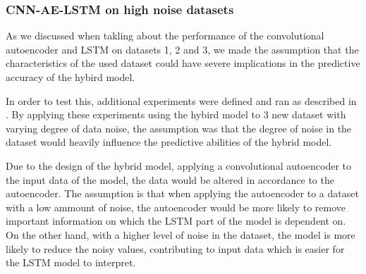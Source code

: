 \subsubsection{CNN-AE-LSTM on high noise datasets}

As we discussed when takling about the performance of the convolutional autoencoder and LSTM on datasets 1, 2 and 3,
we made the assumption that the characteristics of the used dataset could have severe implications in the predictive accuracy of the hybird model.

In order to test this, additional experiments were defined and ran as described in .
By applying these experiments using the hybird model to 3 new dataset with varying degree of data noise,
the assumption was that the degree of noise in the dataset would heavily influence the predictive abilities of the hybrid model.

Due to the design of the hybrid model, applying a convolutional autoencoder to the input data of the model,
the data would be altered in accordance to the autoencoder.
The assumption is that when applying the autoencoder to a dataset with a low ammount of noise,
the autoencoder would be more likely to remove important information on which the LSTM part of the model is dependent on.
On the other hand, with a higher level of noise in the dataset,
the model is more likely to reduce the noisy values, contributing to input data which is easier for the LSTM model to interpret.














\iffalse
The results of Experiment 4 [\Cref{section:results:additional-experimental-plan:Experiment-4}],
and Experiment 1 shows a small increase in performance for the hybrid model on high variance datasets.
Even though these results are not below the threshold, they do show a trend given that the sample sizes were relatively small
(20 samples, and 7 samples), which might be too small to conclude when the
the performance increase is low.

However, from the results of Experiment 4, we can empirically conclude that the CNN-AE-LSTM will
hurt the performance if the datasets contain small amounts of noise. This downside is much
worse than the potential performance gains on noisy datasets.
This can explain the poor results on dataset 2. Since dataset 2 contains a wide variety
of time series.
\fi

